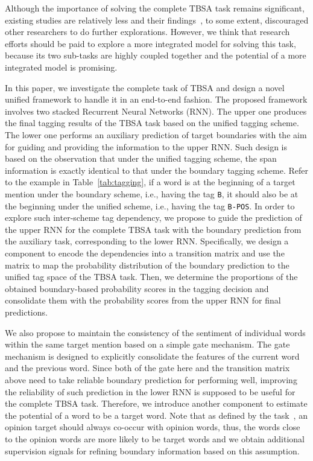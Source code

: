 \documentclass[letterpaper]{article}
\begin{document}
Although the importance of solving the complete TBSA task remains significant, existing studies are relatively less and their findings~\cite{D13-1171,D15-1073}, to some extent, discouraged other researchers to do further explorations. However, we think that research efforts should be paid to explore a more integrated model for solving this task, because its two sub-tasks are highly coupled together and the potential of a more integrated model is promising.


In this paper, we investigate the complete task of TBSA and design a novel unified framework to handle it in an end-to-end fashion. The proposed framework involves two stacked Recurrent Neural Networks (RNN). The upper one produces the final tagging results of the TBSA task based on the unified tagging scheme. The lower one performs an auxiliary prediction of target boundaries with the aim for guiding and providing the information to the upper RNN.
Such design is based on the observation that under the unified tagging scheme, the span information is exactly identical to that under the boundary tagging scheme. Refer to the example in Table~\ref{tab:tagging}, if a word is at the beginning of a target mention under the boundary scheme, i.e., having the tag \texttt{B}, it should also be at the beginning under the unified scheme, i.e., having the tag \texttt{B-POS}. In order to explore such inter-scheme tag dependency, we propose to guide the prediction of the upper RNN for the complete TBSA task with the boundary prediction from the auxiliary task, corresponding to the lower RNN. Specifically, we design a component to encode the dependencies into a transition matrix and use the matrix to map the probability distribution of the boundary prediction to the unified tag space of the TBSA task. Then, we determine the proportions of the obtained boundary-based probability scores in the tagging decision and consolidate them with the probability scores from the upper RNN for final predictions.

We also propose to maintain the consistency of the sentiment of individual words within the same target mention based on a simple gate mechanism. The gate mechanism is designed to explicitly consolidate the features of the current word and the previous word. Since both of the gate here and the transition matrix above need to take reliable boundary prediction for performing well, improving the reliability of such prediction in the lower RNN is supposed to be useful for the complete TBSA task. Therefore, we introduce another component to estimate the potential of a word to be a target word.
Note that as defined by the task~\cite{S14-2004,S15-2082,S16-1002}, an opinion target should always co-occur with opinion words, thus, the words close to the opinion words are more likely to be target words and we obtain additional supervision signals for refining boundary information based on this assumption.
\end{document}
